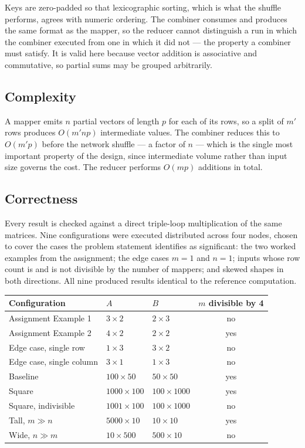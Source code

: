 \documentclass[11pt,a4paper]{article}
\begin{document}
Keys are zero-padded so that lexicographic sorting, which is what the shuffle performs,
agrees with numeric ordering. The combiner consumes and produces the same format as the
mapper, so the reducer cannot distinguish a run in which the combiner executed from one
in which it did not --- the property a combiner must satisfy. It is valid here because
vector addition is associative and commutative, so partial sums may be grouped
arbitrarily.

\subsection{Complexity}
A mapper emits $n$ partial vectors of length $p$ for each of its rows, so a split of
$m'$ rows produces $O(m'np)$ intermediate values. The combiner reduces this to $O(m'p)$
before the network shuffle --- a factor of $n$ --- which is the single most important
property of the design, since intermediate volume rather than input size governs the
cost. The reducer performs $O(mp)$ additions in total.

\subsection{Correctness}
Every result is checked against a direct triple-loop multiplication of the same
matrices. Nine configurations were executed distributed across four nodes, chosen to
cover the cases the problem statement identifies as significant: the two worked examples
from the assignment; the edge cases $m=1$ and $n=1$; inputs whose row count is and is
not divisible by the number of mappers; and skewed shapes in both directions. All nine
produced results identical to the reference computation.

\begin{center}\small
\begin{tabular}{@{}lllc@{}}
\toprule
\textbf{Configuration} & \textbf{$A$} & \textbf{$B$} & \textbf{$m$ divisible by 4} \\
\midrule
Assignment Example 1 & $3\times2$ & $2\times3$ & no \\
Assignment Example 2 & $4\times2$ & $2\times2$ & yes \\
Edge case, single row & $1\times3$ & $3\times2$ & no \\
Edge case, single column & $3\times1$ & $1\times3$ & no \\
Baseline & $100\times50$ & $50\times50$ & yes \\
Square & $1000\times100$ & $100\times1000$ & yes \\
Square, indivisible & $1001\times100$ & $100\times1000$ & no \\
Tall, $m \gg n$ & $5000\times10$ & $10\times10$ & yes \\
Wide, $n \gg m$ & $10\times500$ & $500\times10$ & no \\
\bottomrule
\end{tabular}
\end{center}
\end{document}
